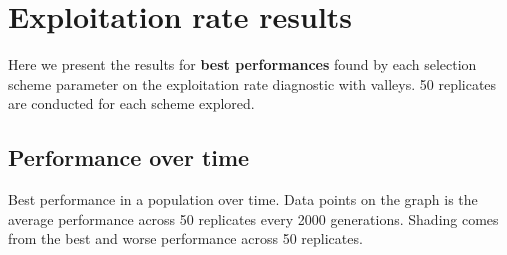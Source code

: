 \documentclass[]{book}
\newenvironment{Shaded}{\begin{snugshade}}{\end{snugshade}}
\newcommand{\DataTypeTok}[1]{\textcolor[rgb]{0.13,0.29,0.53}{#1}}
\newcommand{\KeywordTok}[1]{\textcolor[rgb]{0.13,0.29,0.53}{\textbf{#1}}}
\newcommand{\NormalTok}[1]{#1}
\newcommand{\OperatorTok}[1]{\textcolor[rgb]{0.81,0.36,0.00}{\textbf{#1}}}
\newcommand{\OtherTok}[1]{\textcolor[rgb]{0.56,0.35,0.01}{#1}}
\newcommand{\StringTok}[1]{\textcolor[rgb]{0.31,0.60,0.02}{#1}}
\begin{document}
\begin{Shaded}
\end{Shaded}

\hypertarget{exploitation-rate-results-1}{%
\section{Exploitation rate results}\label{exploitation-rate-results-1}}

Here we present the results for \textbf{best performances} found by each selection scheme parameter on the exploitation rate diagnostic with valleys.
50 replicates are conducted for each scheme explored.

\hypertarget{performance-over-time-3}{%
\subsection{Performance over time}\label{performance-over-time-3}}

Best performance in a population over time.
Data points on the graph is the average performance across 50 replicates every 2000 generations.
Shading comes from the best and worse performance across 50 replicates.
\end{document}
